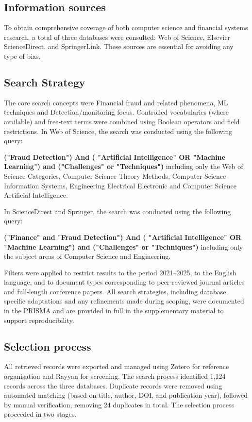 \documentclass[a4paper,fleqn]{cas-dc}
\begin{document}
\subsection{Information sources}
To obtain comprehensive coverage of both computer science and financial systems research, a total of three databases were consulted: Web of Science, Elsevier ScienceDirect, and SpringerLink. These sources are essential for avoiding any type of bias.
\subsection{Search Strategy}
The core search concepts were Financial fraud and related phenomena, ML techniques and Detection/monitoring focus. Controlled vocabularies (where available) and free‑text terms were combined using Boolean operators and field restrictions.
In Web of Science, the search was conducted using the following query: 

\textbf{("Fraud Detection") And ( "Artificial Intelligence" OR  "Machine Learning") and ("Challenges" or "Techniques")}
including only the Web of Science Categories, Computer Science Theory Methods, Computer Science Information Systems, Engineering Electrical Electronic and Computer Science Artificial Intelligence.

In ScienceDirect and Springer, the search was conducted using the following query: 

\textbf{("Finance" and "Fraud Detection") And ( "Artificial Intelligence" OR  "Machine Learning") and ("Challenges" or "Techniques")}
including only the subject areas of Computer Science and Engineering.

Filters were applied to restrict results to the period 2021–2025, to the English language, and to document types corresponding to peer‑reviewed journal articles and full‑length conference papers. 
All search strategies, including database specific adaptations and any refinements made during scoping, were documented in the PRISMA and are provided in full in the supplementary material to support reproducibility.

\subsection{Selection process}
All retrieved records were exported and managed using Zotero for reference organisation and Rayyan for screening. 
The search process identified 1,124 records across the three databases.
Duplicate records were removed using automated matching (based on title, author, DOI, and publication year), followed by manual verification, removing 24 duplicates in total. 
The selection process proceeded in two stages.
\end{document}
